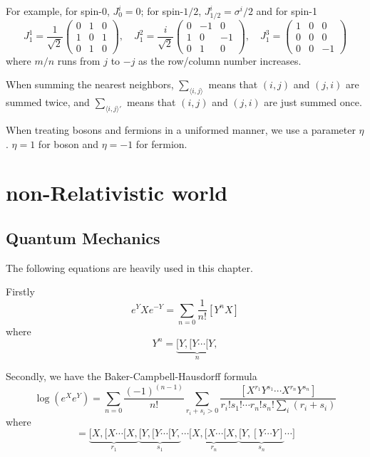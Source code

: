 \documentclass[12pt]{book}
\begin{document}
	For example, for spin-0, $J^i_0=0$; for spin-$1/2$, $J^i_{1/2}=\sigma^i/2$ and for spin-1
	\begin{equation}
		J^1_1 =\frac 1{\sqrt 2}
		\left( \begin{array}{ccc}
		0&1&0\\
		1&0&1\\
		0&1&0  
		\end{array} \right)
		,\quad J^2_1 =\frac i{\sqrt 2}
		\left( \begin{array}{ccc}
		0&-1&0\\
		1&0&-1\\
		0&1&0  
		\end{array} \right)
		,\quad J^3_1 =
		\left( \begin{array}{ccc}
		1&0&0\\
		0&0&0\\
		0&0&-1  
		\end{array} \right)
	\end{equation}
	where $m/n$ runs from $j$ to $-j$ as the row/column number increases.
	
	When summing the nearest neighbors, $\sum_{\langle i,j\rangle}$ means that $(i,j)$ and $(j,i)$ are summed twice, and $\sum_{\langle i,j\rangle'}$ means that $(i,j)$ and $(j,i)$ are just summed once.
	
	When treating bosons and fermions in a uniformed manner, we use a parameter $\eta$. $\eta=1$ for boson and $\eta=-1$ for fermion.
	

	\part{non-Relativistic world}

	\chapter{Quantum Mechanics}
	
	The following equations are heavily used in this chapter.
	
	Firstly
	\begin{equation}
		e^YXe^{-Y}=\sum_{n=0}\frac 1{n!}[Y^nX]
		\label{eqn:matrix1}
	\end{equation}
	where
	\begin{equation}
		Y^n=\underbrace{[Y,[Y\cdots[Y,}_n
	\end{equation}
	
	Secondly, we have the Baker-Campbell-Hausdorff formula
	\begin{equation}
		\log(e^Xe^Y)=\sum_{n=0}\frac{(-1)^{(n-1)}}{n!}\sum_{r_i+s_i>0}\frac{[X^{r_1}Y^{s_1}\cdots X^{r_n}Y^{s_n}]}{r_i!s_1!\cdots r_n!s_n!\sum_i(r_i+s_i)}
	\end{equation}
	where
	\begin{equation}
		[X^{r_1}Y^{s_1}\cdots X^{r_n}Y^{s_n}]=\underbrace{[X,[X\cdots[X,}_{r_1}\underbrace{[Y,[Y\cdots[Y,}_{s_1}\cdots\underbrace{[X,[X\cdots[X,}_{r_n}\underbrace{[Y,[Y\cdots Y]}_{s_n}\cdots]
	\end{equation}
	
\end{document}
